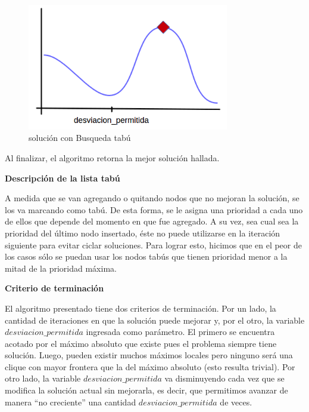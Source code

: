 \begin{figure}[H] %
\begin{center}
\includegraphics[width=250pt]{../imgs/2_tabu.png}
\caption{solución con Busqueda tabú}
\end{center}
\end{figure}

Al finalizar, el algoritmo retorna la mejor solución hallada. \newline

\textbf{Descripción de la lista tabú} \newline

 A medida que se van agregando o quitando nodos que no mejoran la solución, se los va marcando como tabú. De esta forma, se le asigna una prioridad a cada uno de ellos que depende del momento en que fue agregado. A su vez, sea cual sea la prioridad del último nodo insertado, éste no puede utilizarse en la iteración siguiente para evitar ciclar soluciones. Para lograr esto, hicimos que en el peor de los casos sólo se puedan usar los nodos tabús que tienen prioridad menor a la mitad de la prioridad máxima.\newline

\textbf{Criterio de terminación} \newline

 El algoritmo presentado tiene dos criterios de terminación. Por un lado, la cantidad de iteraciones en que la solución puede mejorar y, por el otro, la variable $desviacion\_permitida$ ingresada como parámetro. El primero se encuentra acotado por el máximo absoluto que existe pues el problema siempre tiene solución. Luego, pueden existir muchos máximos locales pero ninguno será una clique con mayor frontera que la del máximo absoluto (esto resulta trivial). Por otro lado, la variable $desviacion\_permitida$ va disminuyendo cada vez que se modifica la solución actual sin mejorarla, es decir, que permitimos avanzar de manera ``no creciente'' una cantidad $desviacion\_permitida$ de veces. \newline




